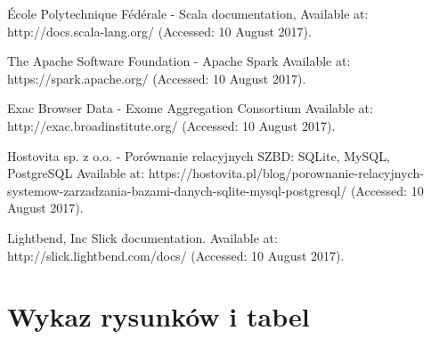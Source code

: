 \documentclass[a4paper,12pt,twoside]{article}
\begin{document}
\newpage
\begin{thebibliography}{99}

École Polytechnique Fédérale - Scala documentation,
Available at: http://docs.scala-lang.org/ (Accessed: 10 August 2017).

The Apache Software Foundation - Apache Spark Available at: https://spark.apache.org/ (Accessed: 10 August 2017).

Exac Browser Data - Exome Aggregation Consortium  
Available at: http://exac.broadinstitute.org/ (Accessed: 10 August 2017).

Hostovita sp. z o.o. - Porównanie relacyjnych SZBD: SQLite, MySQL, PostgreSQL
Available at:
https://hostovita.pl/blog/porownanie-relacyjnych-systemow-zarzadzania-bazami-danych-sqlite-mysql-postgresql/ (Accessed: 10 August 2017).

Lightbend, Inc Slick documentation. Available at:
http://slick.lightbend.com/docs/ (Accessed: 10 August 2017).
\end{thebibliography}

\newpage
\section*{Wykaz rysunków i tabel} 
\end{document}
